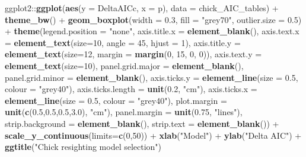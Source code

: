 \documentclass[]{article}
\newenvironment{Shaded}{\begin{snugshade}}{\end{snugshade}}
\newcommand{\KeywordTok}[1]{\textcolor[rgb]{0.13,0.29,0.53}{\textbf{{#1}}}}
\newcommand{\DataTypeTok}[1]{\textcolor[rgb]{0.13,0.29,0.53}{{#1}}}
\newcommand{\DecValTok}[1]{\textcolor[rgb]{0.00,0.00,0.81}{{#1}}}
\newcommand{\FloatTok}[1]{\textcolor[rgb]{0.00,0.00,0.81}{{#1}}}
\newcommand{\StringTok}[1]{\textcolor[rgb]{0.31,0.60,0.02}{{#1}}}
\newcommand{\NormalTok}[1]{{#1}}
\begin{document}
\begin{Shaded}
\begin{Highlighting}[]
\NormalTok{ggplot2::}\KeywordTok{ggplot}\NormalTok{(}\KeywordTok{aes}\NormalTok{(}\DataTypeTok{y =} \NormalTok{DeltaAICc, }\DataTypeTok{x =} \NormalTok{p), }\DataTypeTok{data =} \NormalTok{chick_AIC_tables) +}\StringTok{ }
\StringTok{          }\KeywordTok{theme_bw}\NormalTok{() +}
\StringTok{          }\KeywordTok{geom_boxplot}\NormalTok{(}\DataTypeTok{width =} \FloatTok{0.3}\NormalTok{, }\DataTypeTok{fill =} \StringTok{"grey70"}\NormalTok{, }\DataTypeTok{outlier.size =} \FloatTok{0.5}\NormalTok{) +}
\StringTok{          }\KeywordTok{theme}\NormalTok{(}\DataTypeTok{legend.position =} \StringTok{"none"}\NormalTok{,}
                \DataTypeTok{axis.title.x =} \KeywordTok{element_blank}\NormalTok{(),}
                \DataTypeTok{axis.text.x  =} \KeywordTok{element_text}\NormalTok{(}\DataTypeTok{size=}\DecValTok{10}\NormalTok{, }\DataTypeTok{angle =} \DecValTok{45}\NormalTok{, }\DataTypeTok{hjust =} \DecValTok{1}\NormalTok{), }
                \DataTypeTok{axis.title.y =} \KeywordTok{element_text}\NormalTok{(}\DataTypeTok{size=}\DecValTok{12}\NormalTok{, }\DataTypeTok{margin =} \KeywordTok{margin}\NormalTok{(}\DecValTok{0}\NormalTok{, }\DecValTok{15}\NormalTok{, }\DecValTok{0}\NormalTok{, }\DecValTok{0}\NormalTok{)),}
                \DataTypeTok{axis.text.y  =} \KeywordTok{element_text}\NormalTok{(}\DataTypeTok{size=}\DecValTok{10}\NormalTok{),}
                \DataTypeTok{panel.grid.major =} \KeywordTok{element_blank}\NormalTok{(),}
                \DataTypeTok{panel.grid.minor =} \KeywordTok{element_blank}\NormalTok{(),}
                \DataTypeTok{axis.ticks.y =} \KeywordTok{element_line}\NormalTok{(}\DataTypeTok{size =} \FloatTok{0.5}\NormalTok{, }\DataTypeTok{colour =} \StringTok{"grey40"}\NormalTok{),}
                \DataTypeTok{axis.ticks.length =} \KeywordTok{unit}\NormalTok{(}\FloatTok{0.2}\NormalTok{, }\StringTok{"cm"}\NormalTok{),}
                \DataTypeTok{axis.ticks.x =} \KeywordTok{element_line}\NormalTok{(}\DataTypeTok{size =} \FloatTok{0.5}\NormalTok{, }\DataTypeTok{colour =} \StringTok{"grey40"}\NormalTok{),}
                \DataTypeTok{plot.margin =} \KeywordTok{unit}\NormalTok{(}\KeywordTok{c}\NormalTok{(}\FloatTok{0.5}\NormalTok{,}\FloatTok{0.5}\NormalTok{,}\FloatTok{0.5}\NormalTok{,}\FloatTok{3.0}\NormalTok{), }\StringTok{"cm"}\NormalTok{),}
                \DataTypeTok{panel.margin =} \KeywordTok{unit}\NormalTok{(}\FloatTok{0.75}\NormalTok{, }\StringTok{"lines"}\NormalTok{),}
                \DataTypeTok{strip.background =} \KeywordTok{element_blank}\NormalTok{(), }
                \DataTypeTok{strip.text =} \KeywordTok{element_blank}\NormalTok{()) +}
\StringTok{          }\KeywordTok{scale_y_continuous}\NormalTok{(}\DataTypeTok{limits=}\KeywordTok{c}\NormalTok{(}\DecValTok{0}\NormalTok{,}\DecValTok{50}\NormalTok{)) +}
\StringTok{          }\KeywordTok{xlab}\NormalTok{(}\StringTok{"Model"}\NormalTok{) +}\StringTok{ }
\StringTok{          }\KeywordTok{ylab}\NormalTok{(}\StringTok{"Delta AIC"}\NormalTok{) +}
\StringTok{          }\KeywordTok{ggtitle}\NormalTok{(}\StringTok{"Chick resighting model selection"}\NormalTok{)}
\end{Highlighting}
\end{Shaded}
\end{document}
